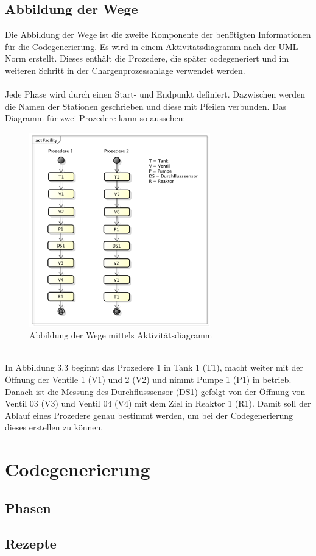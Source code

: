 \subsection{Abbildung der Wege}
Die Abbildung der Wege ist die zweite Komponente der benötigten Informationen für die Codegenerierung. Es wird in einem Aktivitätsdiagramm nach der UML Norm erstellt. Dieses enthält die Prozedere, die später codegeneriert und im weiteren Schritt in der Chargenprozessanlage verwendet werden. \\\\
Jede Phase wird durch einen Start- und Endpunkt definiert. Dazwischen werden die Namen der Stationen geschrieben und diese mit Pfeilen verbunden. Das Diagramm für zwei Prozedere kann so aussehen: 
\begin{figure}[h!]
		\centering
		\includegraphics[width=0.7\textwidth]{graphics/konzept/UML_Activity.png}
		\caption{Abbildung der Wege mittels Aktivitätsdiagramm}
\end{figure}\\
In Abbildung 3.3 beginnt das Prozedere 1 in Tank 1 (T1), macht weiter mit der Öffnung der Ventile 1 (V1) und 2 (V2) und nimmt Pumpe 1 (P1) in betrieb. Danach ist die Messung des Durchflusssensor (DS1) gefolgt von der Öffnung von Ventil 03 (V3) und Ventil 04 (V4) mit dem Ziel in Reaktor 1 (R1). 
Damit soll der Ablauf eines Prozedere genau bestimmt werden, um bei der Codegenerierung dieses erstellen zu können.
\section{Codegenerierung}
\subsection{Phasen}
\subsection{Rezepte}


